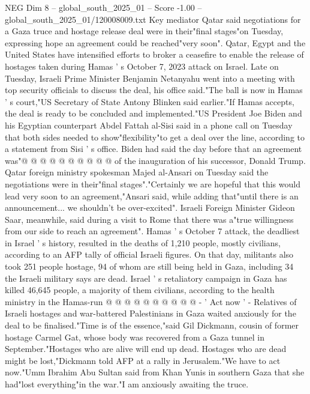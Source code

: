 \begin{textsample}{NEG Dim 8 – global\_south\_2025\_01 – Score -1.00 – global\_south\_2025\_01/120008009.txt}  \label{ex:f8_neg_132}
Key mediator Qatar said negotiations for a Gaza truce and hostage release deal were in their"final stages"on Tuesday, expressing hope an agreement could be reached"very soon".
Qatar, Egypt and the United States have intensified efforts to broker a ceasefire to enable the release of hostages taken during Hamas ' s October 7, 2023 attack on Israel.
Late on Tuesday, Israeli Prime Minister Benjamin Netanyahu went into a meeting with top security officials to discuss the deal, his office said."The ball is now in Hamas ' s court,"US Secretary of State Antony Blinken said earlier."If Hamas accepts, the deal is ready to be concluded and implemented."US President Joe Biden and his Egyptian counterpart Abdel Fattah al-Sisi said in a phone call on Tuesday that both sides needed to show"flexibility"to get a deal over the line, according to a statement from Sisi ' s office.
Biden had said the day before that an agreement was"@ @ @ @ @ @ @ @ @ @ of the inauguration of his successor, Donald Trump.
Qatar foreign ministry spokesman Majed al-Ansari on Tuesday said the negotiations were in their"final stages"."Certainly we are hopeful that this would lead very soon to an agreement,"Ansari said, while adding that"until there is an announcement... we shouldn't be over-excited".
Israeli Foreign Minister Gideon Saar, meanwhile, said during a visit to Rome that there was a"true willingness from our side to reach an agreement".
Hamas ' s October 7 attack, the deadliest in Israel ' s history, resulted in the deaths of 1,210 people, mostly civilians, according to an AFP tally of official Israeli figures.
On that day, militants also took 251 people hostage, 94 of whom are still being held in Gaza, including 34 the Israeli military says are dead.
Israel ' s retaliatory campaign in Gaza has killed 46,645 people, a majority of them civilians, according to the health ministry in the Hamas-run @ @ @ @ @ @ @ @ @ @ - ' Act now ' - Relatives of Israeli hostages and war-battered Palestinians in Gaza waited anxiously for the deal to be finalised."Time is of the essence,"said Gil Dickmann, cousin of former hostage Carmel Gat, whose body was recovered from a Gaza tunnel in September."Hostages who are alive will end up dead.
Hostages who are dead might be lost,"Dickmann told AFP at a rally in Jerusalem."We have to act now."Umm Ibrahim Abu Sultan said from Khan Yunis in southern Gaza that she had"lost everything"in the war."I am anxiously awaiting the truce.

\end{textsample}
